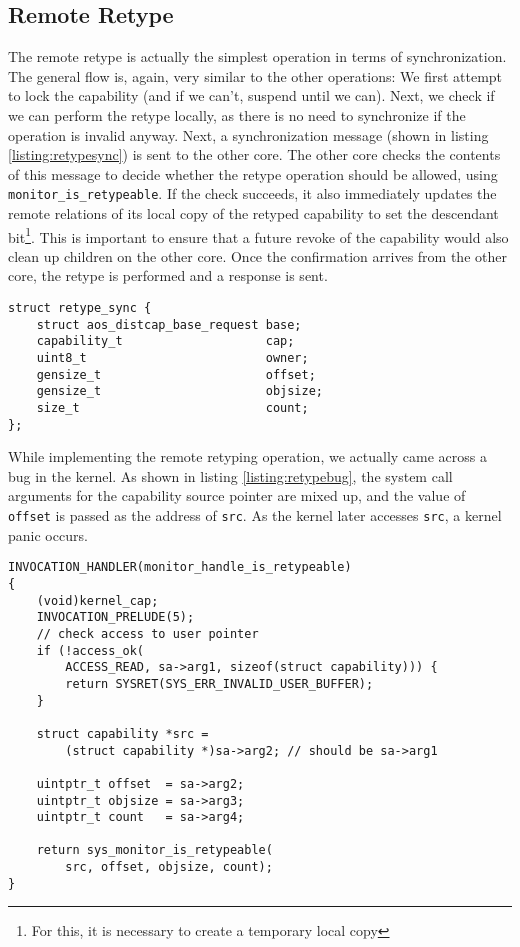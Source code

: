 \subsection{Remote Retype}
The remote retype is actually the simplest operation in terms of synchronization. The general flow is, again, very similar to the other operations: We first attempt to lock the capability (and if we can't, suspend until we can). Next, we check if we can perform the retype locally, as there is no need to synchronize if the operation is invalid anyway. 
Next, a synchronization message (shown in listing \ref{listing:retypesync}) is sent to the other core. The other core checks the contents of this message to decide whether the retype operation should be allowed, using \texttt{monitor\_is\_retypeable}. If the check succeeds, it also immediately updates the remote relations of its local copy of the retyped capability to set the descendant bit\footnote{For this, it is necessary to create a temporary local copy}. This is important to ensure that a future revoke of the capability would also clean up children on the other core. Once the confirmation arrives from the other core, the retype is performed and a response is sent.

\begin{lstlisting}[caption={Payload for retype synchronization},label={listing:retypesync}]
struct retype_sync {
    struct aos_distcap_base_request base;
    capability_t                    cap;
    uint8_t                         owner;
    gensize_t                       offset;
    gensize_t                       objsize;
    size_t                          count;
};
\end{lstlisting}

While implementing the remote retyping operation, we actually came across a bug in the kernel. As shown in listing \ref{listing:retypebug}, the system call arguments for the capability source pointer are mixed up, and the value of \texttt{offset} is passed as the address of \texttt{src}. As the kernel later accesses \texttt{src}, a kernel panic occurs.

\begin{lstlisting}[caption={Bug in the invocation handler for \texttt{monitor\_is\_retypeable}},label={listing:retypebug}]
INVOCATION_HANDLER(monitor_handle_is_retypeable)
{
    (void)kernel_cap;
    INVOCATION_PRELUDE(5);
    // check access to user pointer
    if (!access_ok(
        ACCESS_READ, sa->arg1, sizeof(struct capability))) {
        return SYSRET(SYS_ERR_INVALID_USER_BUFFER);
    }

    struct capability *src = 
        (struct capability *)sa->arg2; // should be sa->arg1

    uintptr_t offset  = sa->arg2;
    uintptr_t objsize = sa->arg3;
    uintptr_t count   = sa->arg4;

    return sys_monitor_is_retypeable(
        src, offset, objsize, count);
}
\end{lstlisting}

